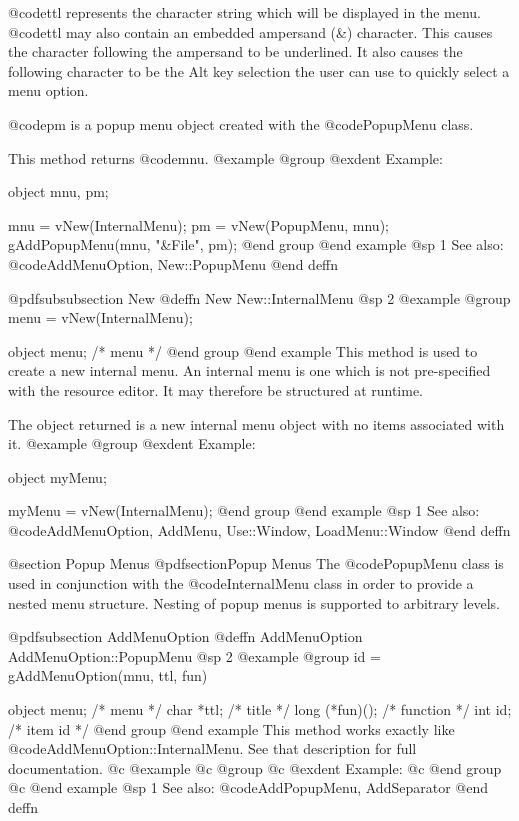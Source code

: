 @code{ttl} represents the character string which will be displayed
in the menu.  @code{ttl} may also contain an embedded ampersand (&)
character.  This causes the character following the ampersand to
be underlined.  It also causes the following character to be the
Alt key selection the user can use to quickly select a menu option.

@code{pm} is a popup menu object created with the @code{PopupMenu}
class.

This method returns @code{mnu}.
@example
@group
@exdent Example:

object  mnu, pm;

mnu = vNew(InternalMenu);
pm  = vNew(PopupMenu, mnu);
gAddPopupMenu(mnu, "&File", pm);
@end group
@end example
@sp 1
See also:  @code{AddMenuOption, New::PopupMenu}
@end deffn








@pdfsubsubsection {New}
@deffn {New} New::InternalMenu
@sp 2
@example
@group
menu = vNew(InternalMenu);

object  menu;   /*  menu     */
@end group
@end example
This method is used to create a new internal menu.  An internal menu is
one which is not pre-specified with the resource editor.  It may therefore
be structured at runtime.

The object returned is a new internal menu object with no items associated
with it.
@example
@group
@exdent Example:

object  myMenu;

myMenu = vNew(InternalMenu);
@end group
@end example
@sp 1
See also:  @code{AddMenuOption, AddMenu, Use::Window, LoadMenu::Window}
@end deffn





@section Popup Menus
@pdfsection{Popup Menus}
The @code{PopupMenu} class is used in conjunction with the
@code{InternalMenu} class in order to provide a nested menu structure.
Nesting of popup menus is supported to arbitrary levels.








@pdfsubsection {AddMenuOption}
@deffn {AddMenuOption} AddMenuOption::PopupMenu
@sp 2
@example
@group
id = gAddMenuOption(mnu, ttl, fun)

object  menu;   /*  menu     */
char    *ttl;   /*  title    */
long    (*fun)(); /*  function  */
int     id;     /*  item id  */
@end group
@end example
This method works exactly like @code{AddMenuOption::InternalMenu}.
See that description for full documentation.
@c @example
@c @group
@c @exdent Example:
@c @end group
@c @end example
@sp 1
See also:  @code{AddPopupMenu, AddSeparator}
@end deffn









